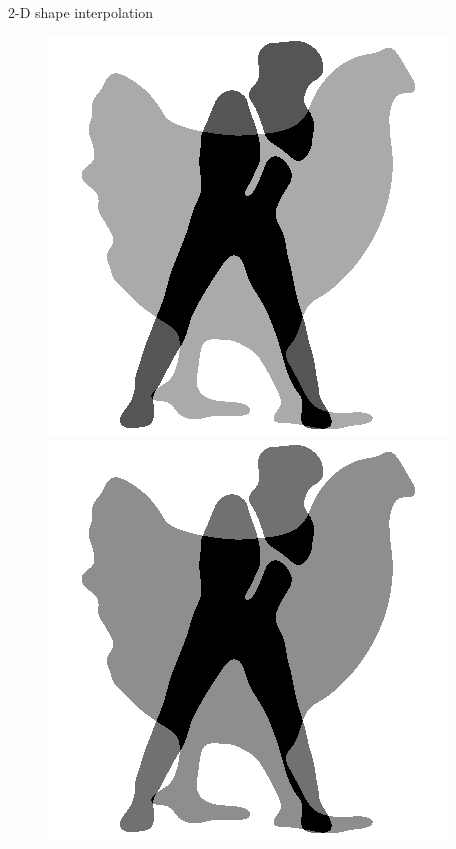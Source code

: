 \begin{frame}{2-D shape interpolation}
\begin{figure}
\begin{minipage}[t]{0.08\linewidth}
        \end{minipage}
        \hfill
        \begin{minipage}[t]{0.08\linewidth}
            \vspace{0pt}
            \centering
            \includegraphics[width=\textwidth]{png/kun-chicken/color3.png}
        \end{minipage}
        \hfill
        \begin{minipage}[t]{0.08\linewidth}
            \vspace{0pt}
            \centering
            \includegraphics[width=\textwidth]{png/kun-chicken/color4.png}

\end{minipage}
\end{figure}
\end{frame}
